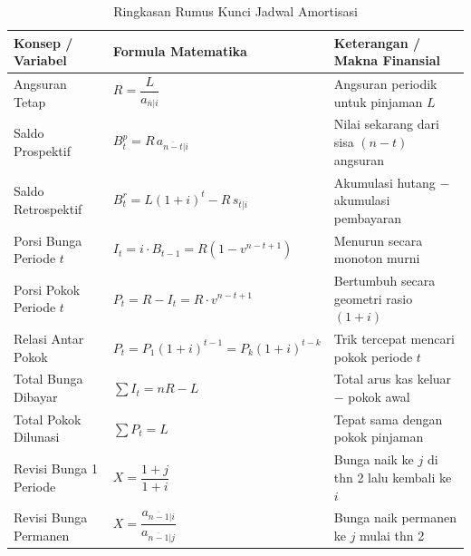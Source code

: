\documentclass[11pt,a4paper]{article}
\begin{document}
\begin{table}[htbp]
\centering
\small
\caption{Ringkasan Rumus Kunci Jadwal Amortisasi}
\vspace{0.5em}
\begin{tabular}{lll}
\toprule
\textbf{Konsep / Variabel} & \textbf{Formula Matematika} & \textbf{Keterangan / Makna Finansial} \\
\midrule
Angsuran Tetap & $R = \dfrac{L}{a_{\overline{n}|i}}$ & Angsuran periodik untuk pinjaman $L$ \\
Saldo Prospektif & $B_t^p = R \, a_{\overline{n-t}|i}$ & Nilai sekarang dari sisa $(n-t)$ angsuran \\
Saldo Retrospektif & $B_t^r = L(1+i)^t - R \, s_{\overline{t}|i}$ & Akumulasi hutang $-$ akumulasi pembayaran \\
Porsi Bunga Periode $t$ & $I_t = i \cdot B_{t-1} = R(1 - v^{n-t+1})$ & Menurun secara monoton murni \\
Porsi Pokok Periode $t$ & $P_t = R - I_t = R \cdot v^{n-t+1}$ & Bertumbuh secara geometri rasio $(1+i)$ \\
Relasi Antar Pokok & $P_t = P_1 (1+i)^{t-1} = P_k (1+i)^{t-k}$ & Trik tercepat mencari pokok periode $t$ \\
Total Bunga Dibayar & $\sum I_t = nR - L$ & Total arus kas keluar $-$ pokok awal \\
Total Pokok Dilunasi & $\sum P_t = L$ & Tepat sama dengan pokok pinjaman \\
Revisi Bunga 1 Periode & $X = \dfrac{1+j}{1+i}$ & Bunga naik ke $j$ di thn 2 lalu kembali ke $i$ \\
Revisi Bunga Permanen & $X = \dfrac{a_{\overline{n-1}|i}}{a_{\overline{n-1}|j}}$ & Bunga naik permanen ke $j$ mulai thn 2 \\
\bottomrule
\end{tabular}
\end{table}
\end{document}
